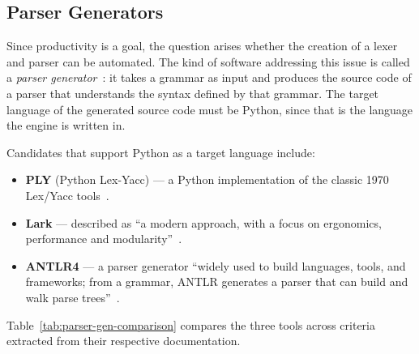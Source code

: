 \subsection{Parser Generators}
\label{subsec:meth-parser-generators}

Since productivity is a goal, the question arises whether the
creation of a lexer and parser can be automated.  The kind of
software addressing this issue is called a
\emph{parser generator}~\cite{mogensen2024compiler}: it takes a
grammar as input and produces the source code of a parser that
understands the syntax defined by that grammar.  The target
language of the generated source code must be Python, since that
is the language the engine is written in.

Candidates that support Python as a target language include:

\begin{itemize}
  \item \textbf{PLY} (Python Lex-Yacc) --- a Python implementation
    of the classic 1970 Lex/Yacc tools~\cite{ply_tool}.
  \item \textbf{Lark} --- described as ``a modern approach, with a
    focus on ergonomics, performance and
    modularity''~\cite{lark_tool}.
  \item \textbf{ANTLR4} --- a parser generator ``widely used to
    build languages, tools, and frameworks; from a grammar, ANTLR
    generates a parser that can build and walk parse
    trees''~\cite{Parr2013}.
\end{itemize}

Table~\ref{tab:parser-gen-comparison} compares the three tools
across criteria extracted from their respective documentation.

